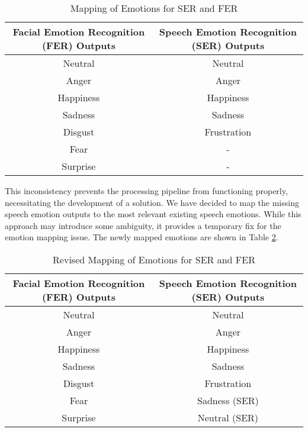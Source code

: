 \begin{table}[h]
    \centering
    \begin{tabular}{|c|c|}
        \hline
        \textbf{Facial Emotion Recognition (FER) Outputs} & \textbf{Speech Emotion Recognition (SER) Outputs} \\
        \hline
        Neutral   & Neutral   \\
        \hline
        Anger     & Anger     \\
        \hline
        Happiness & Happiness \\
        \hline
        Sadness   & Sadness   \\
        \hline
        Disgust   & Frustration \\
        \hline
        Fear      & -         \\
        \hline
        Surprise  & -         \\
        \hline
    \end{tabular}
    \caption{Mapping of Emotions for SER and FER}
    \label{tab:emotion_mapping}
\end{table}

This inconsistency prevents the processing pipeline from functioning properly, necessitating the development of a solution. We have decided to map the missing speech emotion outputs to the most relevant existing speech emotions. While this approach may introduce some ambiguity, it provides a temporary fix for the emotion mapping issue. The newly mapped emotions are shown in Table \ref{tab:revised_mapping}.

\begin{table}[h]
    \centering
    \begin{tabular}{|c|c|}
        \hline
        \textbf{Facial Emotion Recognition (FER) Outputs} & \textbf{Speech Emotion Recognition (SER) Outputs} \\
        \hline
        Neutral   & Neutral   \\
        \hline
        Anger     & Anger     \\
        \hline
        Happiness & Happiness \\
        \hline
        Sadness   & Sadness   \\
        \hline
        Disgust   & Frustration \\
        \hline
        Fear      & Sadness (SER)   \\
        \hline
        Surprise  & Neutral (SER)   \\
        \hline
    \end{tabular}
    \caption{Revised Mapping of Emotions for SER and FER}
    \label{tab:revised_mapping}
\end{table}

